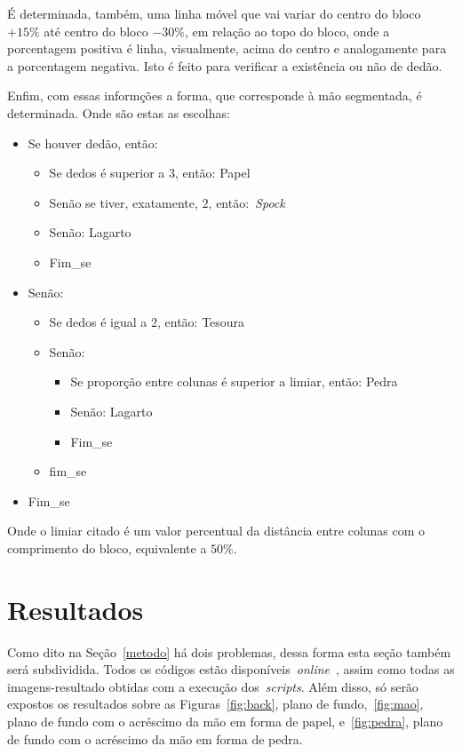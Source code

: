 \documentclass[conference]{Trabalho_Final}
\begin{document}
\'E determinada, tamb\'em, uma linha m\'ovel que vai variar do centro do bloco $+15\%$ at\'e centro do bloco $-30\%$, em rela\c{c}\~ao ao topo do bloco, onde a porcentagem positiva \'e linha, visualmente, acima do centro e analogamente para a porcentagem negativa. Isto \'e feito para verificar a exist\^encia ou n\~ao de ded\~ao.

Enfim, com essas inform\c{c}\~oes a forma, que corresponde \`a m\~ao segmentada, \'e determinada. Onde s\~ao estas as escolhas:

\begin{itemize}
 \item Se houver ded\~ao, ent\~ao:
    \begin{itemize}
    \item Se dedos \'e superior a $3$, ent\~ao: Papel
    \item Sen\~ao se tiver, exatamente, $2$, ent\~ao:~\textit{Spock}
    \item Sen\~ao: Lagarto
    \item Fim\_se
    \end{itemize}
  \item Sen\~ao:
    \begin{itemize}
    \item Se dedos \'e igual a $2$, ent\~ao: Tesoura
    \item Sen\~ao:
        \begin{itemize}
	  \item Se propor\c{c}\~ao entre colunas \'e superior a limiar, ent\~ao: Pedra
	  \item Sen\~ao: Lagarto
	  \item Fim\_se
	\end{itemize}
    \item fim\_se
    \end{itemize}
  \item Fim\_se
\end{itemize}

Onde o limiar citado \'e um valor percentual da dist\^ancia entre colunas com o comprimento do bloco, equivalente a $50\%$.


\section{Resultados}
  \label{resut}
Como dito na Se\c{c}\~ao~\ref{metodo} h\'a dois problemas, dessa forma esta se\c{c}\~ao tamb\'em ser\'a subdividida. Todos os c\'odigos est\~ao dispon\'iveis~\textit{online}~\cite{down}, assim como todas as imagens-resultado obtidas com a execu\c{c}\~ao dos~\textit{scripts}. Al\'em disso, s\'o ser\~ao expostos os resultados sobre as Figuras~\ref{fig:back}, plano de fundo,~\ref{fig:mao}, plano de fundo com o acr\'escimo da m\~ao em forma de papel, e~\ref{fig:pedra}, plano de fundo com o acr\'escimo da m\~ao em forma de pedra.
\end{document}
